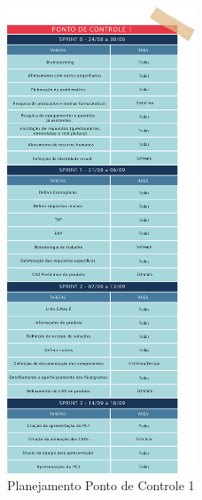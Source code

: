 \begin{apendicesenv}
\vspace{-1.6cm}
\begin{figure}[H]
    \centering
    \includegraphics[width=0.5\textwidth]{figuras/gerenciamento/sprint-pc1.png}
    \caption{Planejamento Ponto de Controle 1}
    \label{fig:Sprint_pc1}
\end{figure}


\end{apendicesenv}
